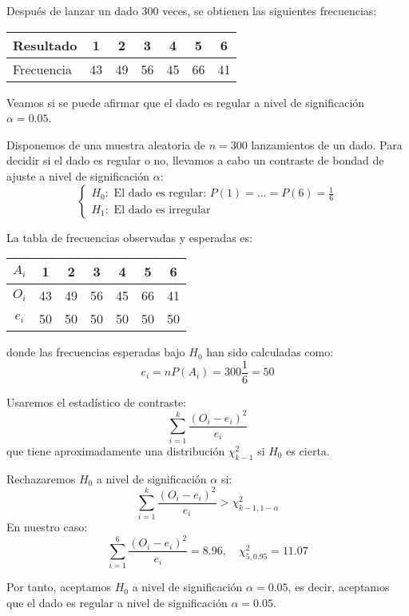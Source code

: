 \begin{example}
    Después de lanzar un dado 300 veces, se obtienen las siguientes frecuencias:
    \begin{center}
        \begin{tabular}{ | l | c c c c c c | }
            \hline
            Resultado  & 1  & 2  & 3  & 4  & 5  & 6  \\
            \hline
            Frecuencia & 43 & 49 & 56 & 45 & 66 & 41 \\
            \hline
        \end{tabular}
    \end{center}

    Veamos si se puede afirmar que el dado es regular a nivel de significación $\alpha = 0.05$.

    Disponemos de una muestra aleatoria de $n = 300$ lanzamientos de un dado.
    Para decidir si el dado es regular o no, llevamos a cabo un contraste de bondad de ajuste a nivel de significación $\alpha$:
    $$\begin{cases}
            H_0: \text{ El dado es regular: } P(1) = \dots = P(6) = \frac{1}{6} \\
            H_1: \text{ El dado es irregular}
        \end{cases}$$

    La tabla de frecuencias observadas y esperadas es:
    \begin{center}
        \begin{tabular}{| c | c c c c c c |}
            \hline
            $A_i$ & 1  & 2  & 3  & 4  & 5  & 6  \\
            \hline
            $O_i$ & 43 & 49 & 56 & 45 & 66 & 41 \\
            $e_i$ & 50 & 50 & 50 & 50 & 50 & 50 \\
            \hline
        \end{tabular}
    \end{center}
    donde las frecuencias esperadas bajo $H_0$ han sido calculadas como:
    $$e_i = nP(A_i) = 300 \frac{1}{6} = 50$$

    Usaremos el estadístico de contraste:
    $$\sum_{i=1}^k \frac{(O_i-e_i)^2}{e_i}$$
    que tiene aproximadamente una distribución $\chi^2_{k-1}$ si $H_0$ es cierta.

    Rechazaremos $H_0$ a nivel de significación $\alpha$ si:
    $$\sum_{i=1}^k \frac{(O_i-e_i)^2}{e_i} > \chi^2_{k-1, 1-\alpha}$$
    En nuestro caso:
    $$\sum_{i=1}^6 \frac{(O_i-e_i)^2}{e_i} = 8.96, \quad \chi^2_{5, 0.95} = 11.07$$

    Por tanto, aceptamos $H_0$ a nivel de significación $\alpha = 0.05$, es decir, aceptamos que el dado es regular a nivel de significación $\alpha = 0.05$.
\end{example}

